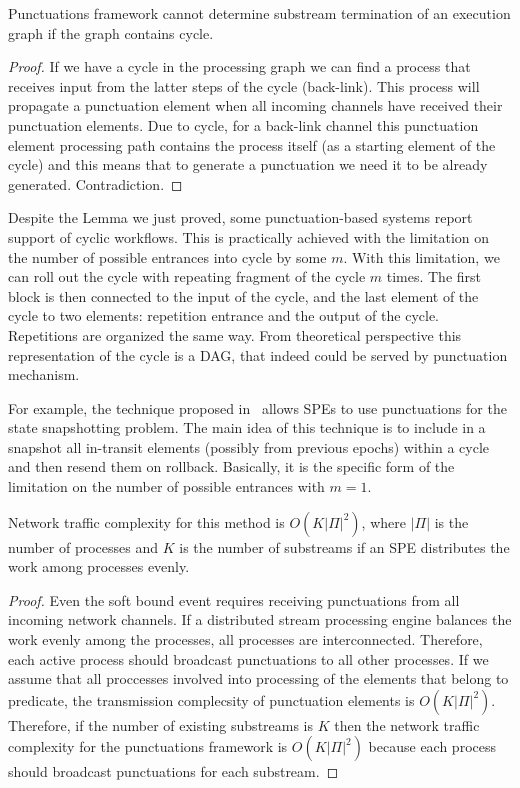 \begin{lemma}
Punctuations framework cannot determine substream termination of an execution graph if the graph contains cycle.
\end{lemma}
\begin{proof}
If we have a cycle in the processing graph we can find a process that receives input from the latter steps of the cycle (back-link). This process will propagate a punctuation element when all incoming channels have received their punctuation elements. Due to cycle, for a back-link channel this punctuation element processing path contains the process itself (as a starting element of the cycle) and this means that to generate a punctuation we need it to be already generated. Contradiction.
\end{proof}

Despite the Lemma we just proved, some punctuation-based systems report support of cyclic workflows. This is practically achieved with the limitation on the number of possible entrances into cycle by some $m$. With this limitation, we can roll out the cycle with repeating fragment of the cycle $m$ times. The first block is then connected to the input of the cycle, and the last element of the cycle to two elements: repetition entrance and the output of the cycle. Repetitions are organized the same way. From theoretical perspective this representation of the cycle is a DAG, that indeed could be served by punctuation mechanism.

For example, the technique proposed in~\cite{Carbone:2017:SMA:3137765.3137777} allows SPEs to use punctuations for the state snapshotting problem. The main idea of this technique is to include in a snapshot all in-transit elements (possibly from previous epochs) within a cycle and then resend them on rollback. Basically, it is the specific form of the limitation on the number of possible entrances with $m=1$.

\begin{lemma}
Network traffic complexity for this method is $O(K|\Pi|^2)$, where $|\Pi|$ is the number of processes and $K$ is the number of substreams if an SPE distributes the work among processes evenly.
\end{lemma}
\begin{proof}

Even the soft bound event requires receiving punctuations from all incoming network channels. If a distributed stream processing engine balances the work evenly among the processes, all processes are interconnected. Therefore, each active process should broadcast punctuations to all other processes. If we assume that all proccesses involved into processing of the elements that belong to predicate, the transmission complecsity of punctuation elements is $O(K|\Pi|^2)$. Therefore, if the number of existing substreams is $K$ then the network traffic complexity for the punctuations framework is $O(K|\Pi|^2)$ because each process should broadcast punctuations for each substream. 

\end{proof}

